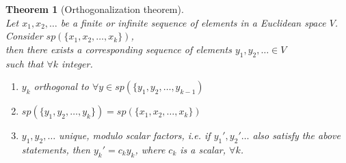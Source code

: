 \documentclass[twoside]{amsart}
\theoremstyle{plain}
\newtheorem{theorem}{Theorem}
\theoremstyle{definition}
\begin{document}
\begin{theorem}[Orthogonalization theorem] \quad \\
  Let $x_1,x_2, \dots $ be a finite or infinite sequence of elements in a Euclidean space $V$.  \\
  Consider $sp(\{ x_1,x_2, \dots , x_k \})$, \\
  then there exists a corresponding sequence of elements $y_1, y_2, \dots  \in V$ \\
  \phantom{the} such that $\forall k $ integer. 
  \begin{enumerate}
    \item $y_k $ orthogonal to $\forall y \in sp(\{ y_1, y_2, \dots, y_{k-1} )$ 
    \item $sp(\{ y_1, y_2, \dots , y_k \} ) = sp( \{ x_1, x_2, \dots , x_k \} ) $
    \item $y_1, y_2, \dots $ unique, modulo scalar factors, i.e. if $y_1', y_2' \dots$ also satisfy the above statements, then $y_k' = c_k y_k$, where $c_k$ is a scalar, $\forall k$.  
  \end{enumerate}
\end{theorem}
\end{document}
